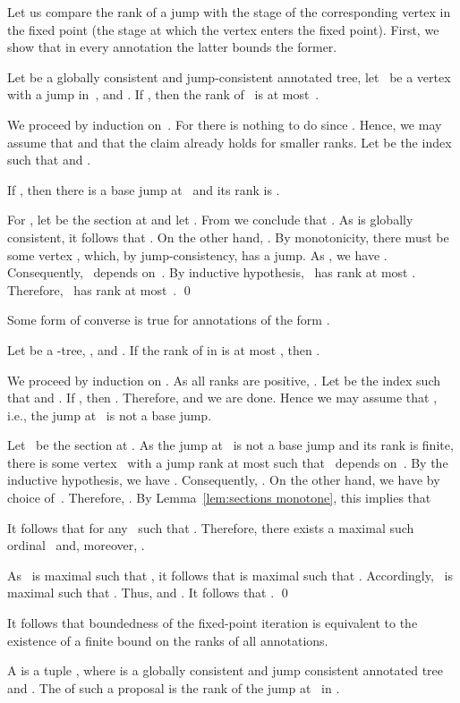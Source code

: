 \documentclass{LMCS}
\begin{document}
Let us compare the rank of a jump with the stage of the corresponding vertex
in the fixed point (the stage at which the vertex enters the fixed point).
First, we show that in every annotation the latter bounds the former.
\begin{lem}\label{lem:stage bounds min rank}
Let 
be a globally consistent and jump-consistent annotated tree,
let ~be a vertex with a jump in~, and .
If ,
then the rank of~ is at most~.
\end{lem}

\proof
We proceed by induction on~.
For  there is nothing to do since
.
Hence, we may assume that  and that the claim already holds for smaller
ranks.
Let  be the index such that  and .

If , then there is a base jump at~ and its rank is .

For , let  be the section at 
and let .
From  we conclude that .
As  is globally consistent, it follows that .
On the other hand, .
By monotonicity,
there must be some vertex ,
which, by jump-consis\-tency, has a jump.
As , we have . Consequently, ~depends on~.
By inductive hypothesis, ~has rank at most .
Therefore, ~has rank at most~.
\qed

Some form of converse is true for annotations of the form .
\begin{lem}\label{lem:min rank bounds stage}
Let  be a -tree, , and .
If the rank of  in  is at most ,
then .
\end{lem}

\proof
We proceed by induction on .
As all ranks are positive, .
Let  be the index such that  and .
If ,
then .
Therefore,  and we are done.
Hence we may assume that , i.e., the jump at~ is not a base jump.

Let ~be the section at .
As the jump at~ is not a base jump and its rank is finite,
there is some vertex~ with a jump rank at most 
such that ~depends on~.
By the inductive hypothesis, we have .
Consequently, .
On the other hand, we have  by choice of~.
Therefore, .
By Lemma~\ref{lem:sections monotone}, this implies that

It follows that 
for any~ such that .
Therefore, there exists a maximal such ordinal~ and,
moreover, .

As ~is maximal such that ,
it follows that  is maximal
such that .
Accordingly, ~is maximal such that
.
Thus, 
and .
It follows that .
\qed

It follows that boundedness of the fixed-point iteration
is equivalent to the existence of a finite bound on the ranks of all annotations.
\begin{defi}
A  is a tuple ,
where 
is a globally consistent and jump consistent annotated tree
and .
The  of such a proposal is the rank of the jump at~ in .
\end{defi}
\end{document}

